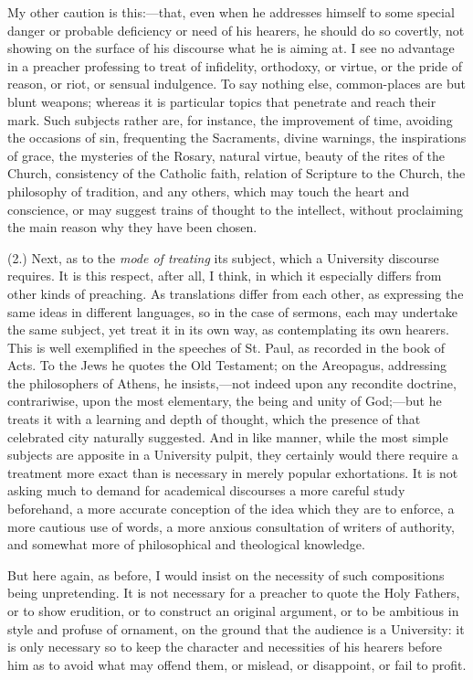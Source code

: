 My other caution is this:—that, even when he addresses himself to
some special danger or probable deficiency or need of his hearers, he
should do so covertly, not showing on the surface of his discourse
what he is aiming at. I see no advantage in a preacher professing to
treat of infidelity, orthodoxy, or virtue, or the pride of reason, or
riot, or sensual indulgence. To say nothing else, common-places are
but blunt weapons; whereas it is particular topics that penetrate and
reach their mark. Such subjects rather are, for instance, the
improvement of time, avoiding the occasions of sin, frequenting the
Sacraments, divine warnings, the inspirations of grace, the mysteries
of the Rosary, natural virtue, beauty of the rites of the Church,
consistency of the Catholic faith, relation of Scripture to the
Church, the philosophy of tradition, and any others, which may touch
the heart and conscience, or may suggest trains of thought to the
intellect, without proclaiming the main reason why they have been
chosen.

(2.) Next, as to the \emph{mode of treating} its subject, which a
University discourse requires. It is this respect, after all, I think,
in which it especially differs from other kinds of preaching. As
translations differ from each other, as expressing the same ideas in
different languages, so in the case of sermons, each may undertake the
same subject, yet treat it in its own way, as contemplating its own
hearers. This is well exemplified in the speeches of St. Paul, as
recorded in the book of Acts. To the Jews he quotes the Old Testament;
on the Areopagus, addressing the philosophers of Athens, he insists,—not
indeed upon any recondite doctrine, contrariwise, upon the most
elementary, the being and unity of God;—but he treats it with a
learning and depth of thought, which the presence of that celebrated
city naturally suggested. And in like manner, while the most simple
subjects are apposite in a University pulpit, they certainly would
there require a treatment more exact than is necessary in merely
popular exhortations. It is not asking much to demand for academical
discourses a more careful study beforehand, a more accurate conception
of the idea which they are to enforce, a more cautious use of words, a
more anxious consultation of writers of authority, and somewhat more
of philosophical and theological knowledge.

But here again, as before, I would insist on the necessity of such
compositions being unpretending. It is not necessary for a preacher to
quote the Holy Fathers, or to show erudition, or to construct an
original argument, or to be ambitious in style and profuse of
ornament, on the ground that the audience is a University: it is
only necessary so to keep the character and necessities of his hearers
before him as to avoid what may offend them, or mislead, or
disappoint, or fail to profit.

